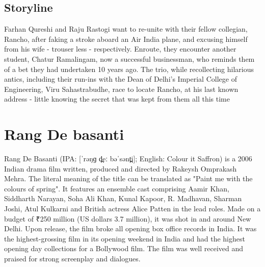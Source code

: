 \documentclass{article}
\begin{document}
\subsection{Storyline}
Farhan Qureshi and Raju Rastogi want to re-unite with their fellow collegian, Rancho, after faking a stroke aboard an Air India plane, and excusing himself from his wife - trouser less - respectively. Enroute, they encounter another student, Chatur Ramalingam, now a successful businessman, who reminds them of a bet they had undertaken 10 years ago. The trio, while recollecting hilarious antics, including their run-ins with the Dean of Delhi's Imperial College of Engineering, Viru Sahastrabudhe, race to locate Rancho, at his last known address - little knowing the secret that was kept from them all this time

\section{Rang De basanti}
Rang De Basanti (IPA: [ˈrəŋɡ d̪eː bəˈsənt̪i]; English: Colour it Saffron) is a 2006 Indian drama film written, produced and directed by Rakeysh Omprakash Mehra. The literal meaning of the title can be translated as "Paint me with the colours of spring". It features an ensemble cast comprising Aamir Khan, Siddharth Narayan, Soha Ali Khan, Kunal Kapoor, R. Madhavan, Sharman Joshi, Atul Kulkarni and British actress Alice Patten in the lead roles. Made on a budget of ₹250 million (US dollars 3.7 million), it was shot in and around New Delhi. Upon release, the film broke all opening box office records in India. It was the highest-grossing film in its opening weekend in India and had the highest opening day collections for a Bollywood film. The film was well received and praised for strong screenplay and dialogues.
\end{document}
